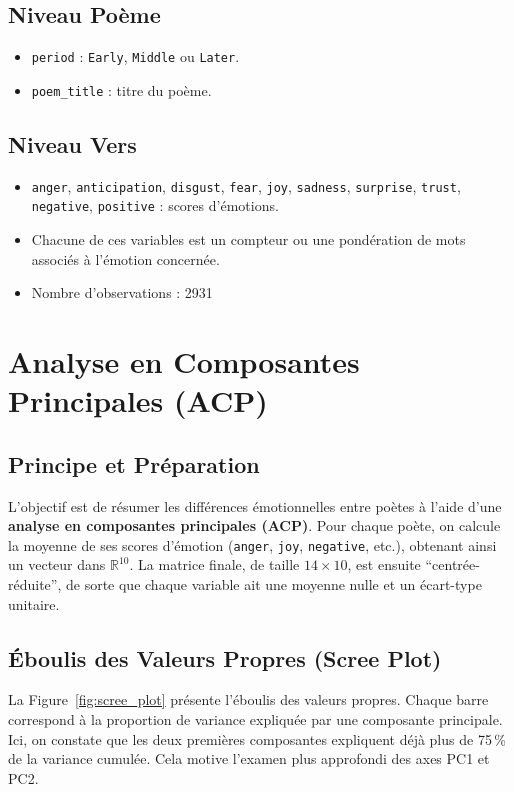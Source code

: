 \documentclass[12pt,a4paper]{article}
\begin{document}
	\subsection{Niveau Poème}
	\begin{itemize}
		\item \texttt{period} : \texttt{Early}, \texttt{Middle} ou \texttt{Later}.
		\item \texttt{poem\_title} : titre du poème.
	\end{itemize}
	
	\subsection{Niveau Vers}
	\begin{itemize}
		\item \texttt{anger}, \texttt{anticipation}, \texttt{disgust}, \texttt{fear}, 
		\texttt{joy}, \texttt{sadness}, \texttt{surprise}, \texttt{trust}, 
		\texttt{negative}, \texttt{positive} : scores d’émotions.
		\item Chacune de ces variables est un compteur ou une pondération de mots 
		associés à l’émotion concernée.
		\item Nombre d'observations : 2931
	\end{itemize}
	

	
\section{Analyse en Composantes Principales (ACP)}

\subsection{Principe et Préparation}
L'objectif est de résumer les différences émotionnelles entre poètes à l'aide 
d'une \textbf{analyse en composantes principales (ACP)}. 
Pour chaque poète, on calcule la moyenne de ses scores d'émotion 
(\texttt{anger}, \texttt{joy}, \texttt{negative}, etc.), 
obtenant ainsi un vecteur dans $\mathbb{R}^{10}$. 
La matrice finale, de taille $14 \times 10$, est ensuite ``centrée-réduite'', 
de sorte que chaque variable ait une moyenne nulle et un écart-type unitaire. 

\subsection{Éboulis des Valeurs Propres (Scree Plot)}
La Figure~\ref{fig:scree_plot} présente l'éboulis des valeurs propres. 
Chaque barre correspond à la proportion de variance expliquée par une composante principale. 
Ici, on constate que les deux premières composantes 
expliquent déjà plus de 75\,\% de la variance cumulée. 
Cela motive l'examen plus approfondi des axes PC1 et PC2.
\end{document}
